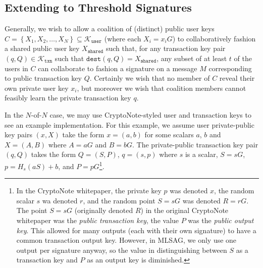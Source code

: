 \documentclass{mrl}
\theoremstyle{definition}
\begin{document}
\subsection{Extending to Threshold Signatures} \label{naiveImplement}


Generally, we wish to allow a coalition of (distinct) public user keys $C=\left\{X_{1}, X_{2}, \ldots, X_{N}\right\} \subseteq \mathcal{K}_{\texttt{user}}$ (where each $X_i = x_iG$) to collaboratively fashion a shared public user key $X_{\texttt{shared}}$ such that, for any transaction key pair $(q,Q) \in \mathcal{K}_{\texttt{txn}}$ such that $\texttt{dest}(q,Q) = X_{\texttt{shared}}$, any subset of at least $t$ of the users in $C$ can collaborate to fashion a signature on a message $M$ corresponding to public transaction key $Q$. Certainly we wish that no member of $C$ reveal their own private user key $x_i$, but moreover we wish that coalition members cannot feasibly learn the private transaction key $q$. 

In the $N$-of-$N$ case, we may use CryptoNote-styled user and transaction keys to see an example implementation. For this example, we assume user private-public key pairs $(x,X)$ take the form $x=(a,b)$ for some scalars $a$, $b$ and $X=(A,B)$ where $A=aG$ and $B=bG$. The private-public transaction key pair $(q,Q)$ takes the form $Q=(S,P)$, $q=(s,p)$ where $s$ is a scalar, $S=sG$, $p=H_s(aS)+b$, and $P=pG$\footnote{In the CryptoNote whitepaper, the private key $p$ was denoted $x$, the random scalar $s$ wa denoted $r$, and the random point $S=sG$ was denoted $R=rG$. The point $S=sG$ (originally denoted $R$) in the original CryptoNote whitepaper was the \textit{public transaction key}, the value $P$ was the \textit{public output key}. This allowed for many outputs (each with their own signature) to have a common transaction output key. However, in MLSAG, we only use one output per signature anyway, so the value in distinguishing between $S$ as a transaction key and $P$ as an output key is diminished.}.
\end{document}
